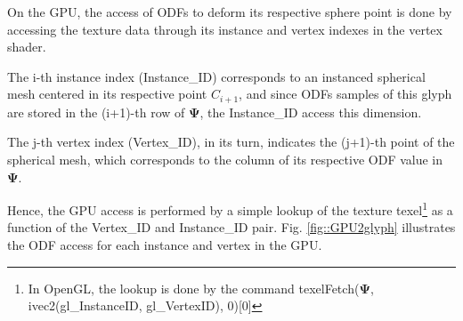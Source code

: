 \documentclass[twoside,twocolumn,10pt]{article}
\begin{document}
On the GPU, the access of ODFs to deform its respective sphere point is done by accessing the texture data through its instance and vertex indexes in the vertex shader.

The i-th instance index (Instance\_ID) corresponds to an instanced spherical mesh centered in its respective point $C_{i+1}$, and since ODFs samples of this glyph are stored in the (i+1)-th row of $\bm{\Psi}$, the Instance\_ID access this dimension.

The j-th vertex index (Vertex\_ID), in its turn, indicates the (j+1)-th point of the spherical mesh, which corresponds to the column of its respective ODF value in $\bm{\Psi}$.

Hence, the GPU access is performed by a simple lookup of the texture texel\footnote{In OpenGL, the lookup is done by the command texelFetch($\bm{\Psi}$, ivec2(gl\_InstanceID, gl\_VertexID), 0)[0]} as a function of the Vertex\_ID and Instance\_ID pair. Fig. \ref{fig::GPU2glyph} illustrates the ODF access for each instance and vertex in the GPU.


\end{document}

